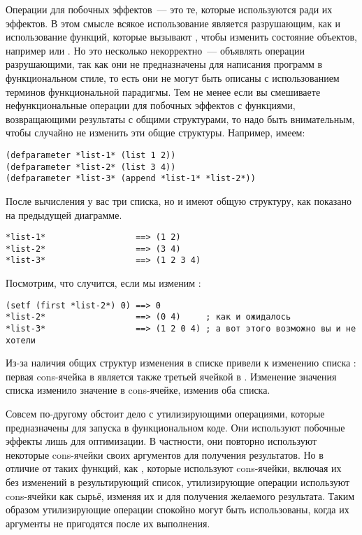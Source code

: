 Операции для побочных эффектов~--- это те, которые используются ради их эффектов. В этом
смысле всякое использование  является разрушающим, как и использование
функций, которые вызывают , чтобы изменить состояние объектов, например
 или . Но это несколько некорректно~--- объявлять операции
разрушающими, так как они не предназначены для написания программ в функциональном стиле,
то есть они не могут быть описаны с использованием терминов функциональной парадигмы. Тем не
менее если вы смешиваете нефункциональные операции для побочных эффектов с функциями,
возвращающими результаты с общими структурами, то надо быть внимательным, чтобы случайно
не изменить эти общие структуры. Например, имеем:

\begin{lstlisting}
(defparameter *list-1* (list 1 2))
(defparameter *list-2* (list 3 4))
(defparameter *list-3* (append *list-1* *list-2*))
\end{lstlisting}

После вычисления у вас три списка, но  и  имеют общую
структуру, как показано на предыдущей диаграмме.

\begin{lstlisting}
*list-1*                  ==> (1 2)
*list-2*                  ==> (3 4)
*list-3*                  ==> (1 2 3 4)
\end{lstlisting}

Посмотрим, что случится, если мы изменим :

\begin{lstlisting}
(setf (first *list-2*) 0) ==> 0
*list-2*                  ==> (0 4)     ; как и ожидалось
*list-3*                  ==> (1 2 0 4) ; а вот этого возможно вы и не хотели
\end{lstlisting}

Из-за наличия общих структур изменения в списке  привели к изменению списка
: первая cons-ячейка в  является также третьей ячейкой в
. Изменение значения  списка  изменило значение
 в cons-ячейке, изменив оба списка.

Совсем по-другому обстоит дело с утилизирующими операциями, которые предназначены для
запуска в функциональном коде. Они используют побочные эффекты лишь для оптимизации. В
частности, они повторно используют некоторые cons-ячейки своих аргументов для получения
результатов. Но в отличие от таких функций, как , которые используют
cons-ячейки, включая их без изменений в результирующий список, утилизирующие операции
используют cons-ячейки как сырьё, изменяя их  и  для получения
желаемого результата. Таким образом утилизирующие операции спокойно могут быть
использованы, когда их аргументы не пригодятся после их выполнения.

